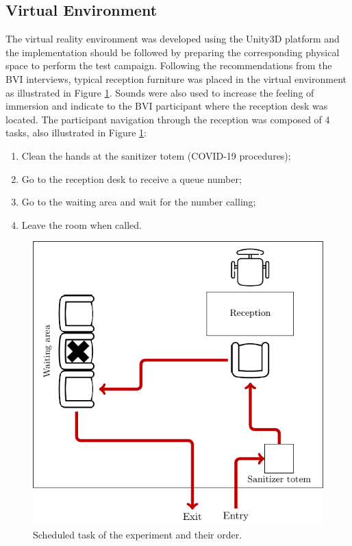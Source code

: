     \subsection*{Virtual Environment}
    The virtual reality environment was developed using the Unity3D platform and the implementation should be followed by preparing the corresponding physical space to perform the test campaign. Following the recommendations from the BVI interviews, typical reception furniture was placed in the virtual environment as illustrated in Figure \ref{fig:task_diagram}. Sounds were also used to increase the feeling of immersion and indicate to the BVI participant where the reception desk was located. The participant navigation through the reception was composed of 4 tasks, also illustrated in Figure \ref{fig:task_diagram}:

    \begin{enumerate}
        \item Clean the hands at the sanitizer totem (COVID-19 procedures);
        \item Go to the reception desk to receive a queue number;
        \item Go to the waiting area and wait for the number calling;
        \item Leave the room when called.
    \end{enumerate}

    \begin{figure}[H]
        \includegraphics[width = \linewidth]{Metodologia/caminho.pdf}
        \caption{Scheduled task of the experiment and their order.}
        \label{fig:task_diagram}
    \end{figure}

